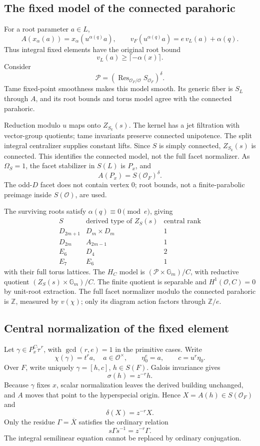 \documentclass[11pt,a4paper]{article}
\theoremstyle{definition}
\theoremstyle{remark}
\begin{document}
\subsection{The fixed model of the connected parahoric}
For a root parameter \(a\in L\),
\[
A(x_\alpha(a))=x_\alpha(u^{\alpha(q)}a),\qquad
v_F(u^{\alpha(q)}a)=e\,v_L(a)+\alpha(q).
\]
Thus integral fixed elements have the original root bound
\[
v_L(a)\ge\lceil-\alpha(x)\rceil.
\]
Consider
\[
\mathscr P=
\left(\operatorname{Res}_{\mathcal O_F/\mathcal O}
S_{\mathcal O_F}\right)^\delta.
\]
Tame fixed-point smoothness makes this model smooth. Its generic
fiber is \(S_L\) through \(A\), and its root bounds and torus model
agree with the connected parahoric.

Reduction modulo \(u\) maps onto \(Z_{S_k}(s)\). The kernel has a
jet filtration with vector-group quotients; tame invariants preserve
connected unipotence. The split integral centralizer supplies constant
lifts. Since \(S\) is simply connected, \(Z_{S_k}(s)\) is connected.
This identifies the connected model, not the full facet normalizer.
As \(\Omega_S=1\), the facet stabilizer in \(S(L)\) is \(P_x\), and
\[
A(P_x)=S(\mathcal O_F)^\delta.
\]
The odd-\(D\) facet does not contain vertex \(0\); root bounds,
not a finite-parabolic preimage inside \(S(\mathcal O)\), are used.

The surviving roots satisfy \(\alpha(q)\equiv0\pmod e\), giving
\[
\begin{array}{c|c|c}
S&\text{derived type of }Z_S(s)&\text{central rank}\\ \hline
D_{2m+1}&D_m\times D_m&1\\
D_{2m}&A_{2m-1}&1\\
E_6&D_4&2\\
E_7&E_6&1
\end{array}
\]
with their full torus lattices. The \(H_C\) model is
\((\mathscr P\times\mathbb G_m)/C\), with reductive quotient
\((Z_S(s)\times\mathbb G_m)/C\).
The finite quotient is separable and \(H^1(\mathcal O,C)=0\)
by unit-root extraction.
The full facet normalizer modulo the connected parahoric is
\(\mathbb Z\), measured by \(v(\chi)\); only its diagram action
factors through \(\mathbb Z/e\).

\subsection{Central normalization of the fixed element}
Let
\(\gamma\in P_x^C\dot\tau^{\,r}\), with \(\gcd(r,e)=1\) in the
primitive cases. Write
\[
\chi(\gamma)=t^ra,\quad a\in\mathcal O^\times,\qquad
\eta_0^e=a,\qquad c=u^r\eta_0.
\]
Over \(F\), write uniquely \(\gamma=[h,c]\), \(h\in S(F)\).
Galois invariance gives
\[
\sigma(h)=z^{-r}h.
\]
Because \(\gamma\) fixes \(x\), scalar normalization leaves the
derived building unchanged, and \(A\) moves that point to the
hyperspecial origin. Hence \(X=A(h)\in S(\mathcal O_F)\) and
\[
\boxed{\delta(X)=z^{-r}X.}
\]
Only the residue \(\Gamma=\overline X\) satisfies the ordinary relation
\[
s\Gamma s^{-1}=z^{-r}\Gamma.
\]
The integral semilinear equation cannot be replaced by ordinary
conjugation.
\end{document}
